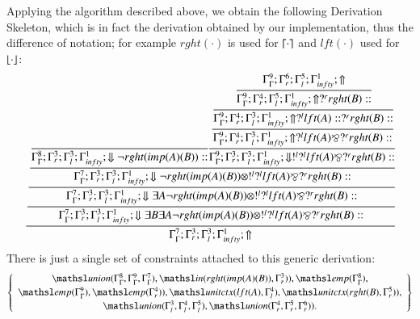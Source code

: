\documentclass[a4paper,10pt]{article}
\newcommand{\elin}[2]{\ensuremath{{\tsl{unitctx}(\ensuremath{#1}, \ensuremath{#2})}}}
\newcommand{\emp}[1]{\ensuremath{{\tsl{emp}(\ensuremath{#1})}}}
\newcommand{\union}[3]{\ensuremath{{\tsl{union}(\ensuremath{#1},\ensuremath{#2},\ensuremath{ #3})}}}
\newcommand{\In}[2]{\ensuremath{\tsl{in}(\ensuremath{#1},\ensuremath{#2})}}
\begin{document}
Applying the algorithm described above, we obtain the following Derivation Skeleton, which is in fact the 
derivation obtained by our implementation, thus the difference of notation; for example $rght(\cdot)$ is used for
$\lceil \cdot \rceil$ and $lft(\cdot)$ used for $\lfloor \cdot \rfloor$:
{\small
\[
\cfrac{\cfrac{\cfrac{\cfrac{\cfrac{}
{\Gamma_{ \Gamma}^{8} ; \Gamma_{r}^{3} ; \Gamma_{l}^{3} ; \Gamma_{ infty}^{1} ;  \Downarrow \neg rght (imp (A) (B) )  :: }
\cfrac{\cfrac{\cfrac{\cfrac{\Gamma_{ \Gamma}^{9} ; \Gamma_{r}^{6} ; \Gamma_{l}^{5} ; \Gamma_{ infty}^{1} ;  \Uparrow }
{\Gamma_{ \Gamma}^{9} ; \Gamma_{r}^{4} ; \Gamma_{l}^{5} ; \Gamma_{ infty}^{1} ;  \Uparrow  ?^{r} rght (B)  :: }}
{\Gamma_{ \Gamma}^{9} ; \Gamma_{r}^{4} ; \Gamma_{l}^{3} ; \Gamma_{ infty}^{1} ;  \Uparrow  ?^{l} lft (A)  ::  ?^{r} rght (B)  :: }}
{\Gamma_{ \Gamma}^{9} ; \Gamma_{r}^{4} ; \Gamma_{l}^{3} ; \Gamma_{ infty}^{1} ;  \Uparrow  ?^{l} lft (A)  \bindnasrepma  ?^{r} rght (B)  :: }}
{\Gamma_{ \Gamma}^{9} ; \Gamma_{r}^{3} ; \Gamma_{l}^{3} ; \Gamma_{ infty}^{1} ;  \Downarrow  !^{l}  ?^{l} lft (A)  \bindnasrepma  ?^{r} rght (B)  :: }}
{\Gamma_{ \Gamma}^{7} ; \Gamma_{r}^{3} ; \Gamma_{l}^{3} ; \Gamma_{ infty}^{1} ;  \Downarrow \neg rght (imp (A) (B) )  \otimes  !^{l}  ?^{l} lft (A)  \bindnasrepma  ?^{r} rght (B)  :: }}
{\Gamma_{ \Gamma}^{7} ; \Gamma_{r}^{3} ; \Gamma_{l}^{3} ; \Gamma_{ infty}^{1} ;  \Downarrow \exists A \neg rght (imp (A) (B) )  \otimes  !^{l}  ?^{l} lft (A)  \bindnasrepma  ?^{r} rght (B)  :: }}
{\Gamma_{ \Gamma}^{7} ; \Gamma_{r}^{3} ; \Gamma_{l}^{3} ; \Gamma_{ infty}^{1} ;  \Downarrow \exists B \exists A \neg rght (imp (A) (B) )  \otimes  !^{l}  ?^{l} lft (A)  \bindnasrepma  ?^{r} rght (B)  :: }}
{\Gamma_{ \Gamma}^{7} ; \Gamma_{r}^{3} ; \Gamma_{l}^{3} ; \Gamma_{ infty}^{1} ;  \Uparrow }
\]
}
There is just a single set of constraints attached to this generic derivation:
\[
 \left\{\begin{array}{c}
  \union{\Gamma_{ \Gamma}^{8}}{\Gamma_{ \Gamma}^{9}}{\Gamma_{ \Gamma}^{7}}, \In{rght (imp (A) (B)) }{ \Gamma_{r}^{3})}, 
  \emp{\Gamma_{ \Gamma}^{8}},\\[2pt]
  \emp{\Gamma_{ \Gamma}^{9}}, \emp{\Gamma_{r}^{4})},\elin{lft (A)}{ \Gamma_{l}^{4}},
  \elin{rght (B)}{ \Gamma_{r}^{5})},\\[2pt]
  \union{\Gamma_{l}^{3}} {\Gamma_{l}^{4}} {\Gamma_{l}^{5}},\union{\Gamma_{r}^{4}}{\Gamma_{r}^{5} } {\Gamma_{r}^{6})}.
 \end{array}\right\}
\]
\end{document}
